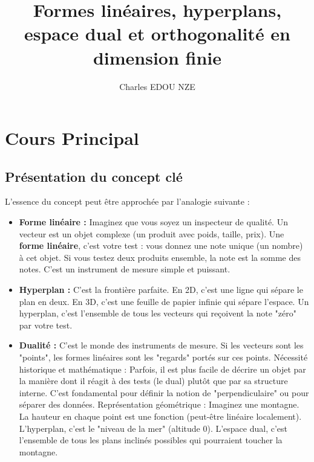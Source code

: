 \documentclass[12pt,a4paper]{report}
\title{Formes linéaires, hyperplans, espace dual et orthogonalité en dimension finie}
\author{Charles EDOU NZE}
\date{}
\begin{document}
\maketitle
\tableofcontents
\newpage

\chapter{Cours Principal}


\section{Présentation du concept clé}
L'essence du concept peut être approchée par l'analogie suivante :
\begin{itemize}
\item \textbf{Forme linéaire :} Imaginez que vous soyez un inspecteur de qualité. Un vecteur est un objet complexe (un produit avec poids, taille, prix). Une \textbf{forme linéaire}, c'est votre test : vous donnez une note unique (un nombre) à cet objet. Si vous testez deux produits ensemble, la note est la somme des notes. C'est un instrument de mesure simple et puissant.
\item \textbf{Hyperplan :} C'est la frontière parfaite. En 2D, c'est une ligne qui sépare le plan en deux. En 3D, c'est une feuille de papier infinie qui sépare l'espace. Un hyperplan, c'est l'ensemble de tous les vecteurs qui reçoivent la note "zéro" par votre test.
\item \textbf{Dualité :} C'est le monde des instruments de mesure. Si les vecteurs sont les "points", les formes linéaires sont les "regards" portés sur ces points.
Nécessité historique et mathématique : Parfois, il est plus facile de décrire un objet par la manière dont il réagit à des tests (le dual) plutôt que par sa structure interne. C'est fondamental pour définir la notion de "perpendiculaire" ou pour séparer des données.
Représentation géométrique : Imaginez une montagne. La hauteur en chaque point est une fonction (peut-être linéaire localement). L'hyperplan, c'est le "niveau de la mer" (altitude 0). L'espace dual, c'est l'ensemble de tous les plans inclinés possibles qui pourraient toucher la montagne.
\end{itemize}
\end{document}
